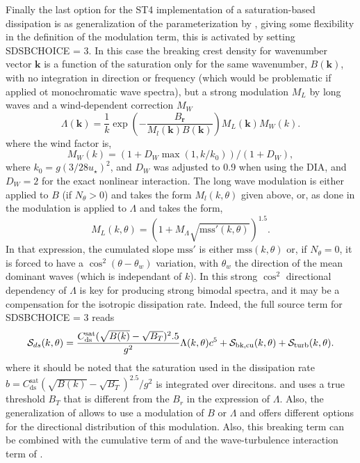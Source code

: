 Finally the last option for the ST4 implementation of a saturation-based dissipation is as generalization 
of the parameterization by \citet{Romero2019}, giving some flexibility in the definition of the modulation 
term, this is activated by setting  {\F  SDSBCHOICE  = 3}. In this case the  breaking crest density for wavenumber vector  
$\mathbf{k}$ is a function of the saturation only for the same wavenumber, $B(\mathbf{k})$, with no integration in direction 
or frequency (which would be problematic if applied ot monochromatic wave spectra), but a strong modulation $M_L$  by long waves
and a wind-dependent correction $M_W$
\begin{equation}
\Lambda (\mathbf{k}) = \frac{1}{k} \exp \left(-\frac{B_{\mathbf{r}}}{M_l(\mathbf{k})  B(\mathbf{k})}\right) M_L(\mathbf{k}) M_W(k).
\end{equation}
where the wind factor is, 
\begin{equation}
 M_W(k)=\left( 1+ D_W  \max(1,k/k_0) \right) / (1+D_W),
\end{equation}
where $k_0=g (3/ 28 u_\star)^2$, and $D_W$ was adjusted to 0.9 when using the DIA, and $D_W=2$ for the exact nonlinear interaction.
The long wave modulation is either applied to $B$ (if $N_\theta > 0$) and takes the form $ M_l(k,\theta)$ given above, 
or, as done in \cite{Romero2019} the modulation is applied to  $\Lambda$ and takes the form, 
\begin{equation}
 M_L(k,\theta)=\left( 1+ M_\Lambda \sqrt{\mathrm{mss}'(k,\theta)}  \right)^{1.5}.
\end{equation}
In that expression, the cumulated slope $\mathrm{mss}'$ is either $\mathrm{mss}(k,\theta)$ or, if $N_\theta=0$, it is forced to have a $\cos^2 (\theta-\theta_w)$ variation, 
with $\theta_w$ the direction of the mean dominant waves (which is independant of $k$). In \cite{Romero2019} this strong $\cos^2$ directional dependency of $\Lambda$ is key for producing 
strong bimodal spectra, and it may be a compensation for the isotropic dissipation rate. Indeed, the full source term for {\F  SDSBCHOICE  = 3} reads 
\begin{eqnarray}
{\cal S}_{ds}(k,\theta)=  \frac{C_{\mathrm{ds}}^{\mathrm{sat}} (\sqrt{B(k)}-\sqrt{B_T} )^2.5}{g^2} \Lambda (k,\theta) c^5 + {\cal S}_{\mathrm{bk,cu}}(k,\theta) + {\cal S}_{\mathrm{turb}}(k,\theta) \label{Sds_all}. \nonumber \\
\end{eqnarray}
where it should be noted that the saturation used in the dissipation rate $b=C_{\mathrm{ds}}^{\mathrm{sat}} (\sqrt{B(k)}-\sqrt{B_T} )^2.5/{g^2}$ is integrated over direcitons. and uses a true threshold $B_T$ that is different from the $B_r$ in the expression of $\Lambda$. 
Also, the generalization of \cite{Romero2019} allows to use a modulation of $B$ or $\Lambda$ and offers different options for the directional distribution of this modulation. Also, this breaking term can be combined with the cumulative term of \cite{art:Aea10} and the wave-turbulence interaction term of \citet{art:AJ06}. 


